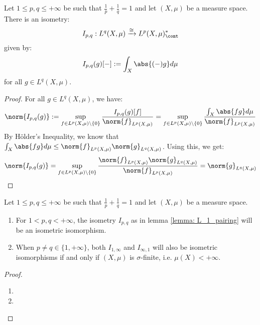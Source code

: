         \begin{lemma} \label{lemma: L_1_pairing}
            Let $1 \leq p, q \leq +\infty$ be such that $\frac1p + \frac1q = 1$ and let $(X, \mu)$ be a measure space. There is an isometry:
                $$I_{p, q}: L^q(X, \mu) \xrightarrow[]{\cong} L^p(X, \mu)^*_{\cont}$$
            given by:
                $$I_{p, q}(g)[-] := \int_X \abs{(-) g} d\mu$$
            for all $g \in L^q(X, \mu)$.
        \end{lemma}
            \begin{proof}
                For all $g \in L^q(X, \mu)$, we have:
                    $$\norm{I_{p, q}(g)} := \sup_{f \in L^p(X, \mu) \setminus \{0\}} \frac{ I_{p, q}(g)[f] }{\norm{f}_{L^p(X, \mu)}} = \sup_{f \in L^p(X, \mu) \setminus \{0\}} \frac{ \int_X \abs{fg} d\mu }{\norm{f}_{L^p(X, \mu)}}$$
                By H\"older's Inequality, we know that $\int_X \abs{fg} d\mu \leq \norm{f}_{L^p(X, \mu)} \norm{g}_{L^q(X, \mu)}$. Using this, we get:
                    $$\norm{I_{p, q}(g)} = \sup_{f \in L^p(X, \mu) \setminus \{0\}} \frac{ \norm{f}_{L^p(X, \mu)} \norm{g}_{L^q(X, \mu)} }{\norm{f}_{L^p(X, \mu)}} = \norm{g}_{L^q(X, \mu)}$$
            \end{proof}
        \begin{theorem} \label{theorem: L_p_space_duality}
            Let $1 \leq p, q \leq +\infty$ be such that $\frac1p + \frac1q = 1$ and let $(X, \mu)$ be a measure space.
            \begin{enumerate}
                \item For $1 < p, q < +\infty$, the isometry $I_{p, q}$ as in lemma \ref{lemma: L_1_pairing} will be an isometric isomorphism.
                \item When $p \not = q \in \{1, +\infty\}$, both $I_{1, \infty}$ and $I_{\infty, 1}$ will also be isometric isomorphisms if and only if $(X, \mu)$ is $\sigma$-finite, i.e. $\mu(X) < +\infty$.
            \end{enumerate}
        \end{theorem}
            \begin{proof}
                \begin{enumerate}
                    \item 
                    \item 
                \end{enumerate}
            \end{proof}
            
